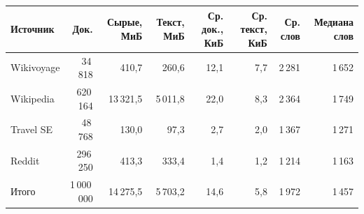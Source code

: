 \begin{tabular}{|l|r|r|r|r|r|r|r|}
\hline
Источник & Док. & Сырые, МиБ & Текст, МиБ & Ср. док., КиБ & Ср. текст, КиБ & Ср. слов & Медиана слов \\
\hline
Wikivoyage & 34\,818 & 410,7 & 260,6 & 12,1 & 7,7 & 2\,281 & 1\,652 \\
\hline
Wikipedia & 620\,164 & 13\,321,5 & 5\,011,8 & 22,0 & 8,3 & 2\,364 & 1\,749 \\
\hline
Travel SE & 48\,768 & 130,0 & 97,3 & 2,7 & 2,0 & 1\,367 & 1\,271 \\
\hline
Reddit & 296\,250 & 413,3 & 333,4 & 1,4 & 1,2 & 1\,214 & 1\,163 \\
\hline
Итого & 1\,000\,000 & 14\,275,5 & 5\,703,2 & 14,6 & 5,8 & 1\,972 & 1\,457 \\
\hline
\end{tabular}
